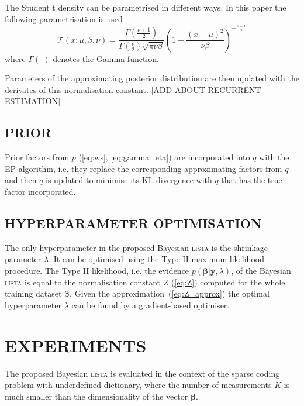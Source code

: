 \documentclass[letterpaper]{article}
\begin{document}
The Student t density can be parametrised in different ways. In this paper the following parametrisation is used 
\begin{equation}
\mathcal{T}(x; \mu, \beta, \nu) = \frac{\Gamma\left(\frac{\nu + 1}{2}\right)}{\Gamma\left(\frac{\nu}{2}\right)\sqrt{\pi \nu \beta}} \left(1 + \frac{(x - \mu)^2}{\nu\beta}\right)^{-\frac{\nu + 1}{2}}
\end{equation}
where $\Gamma(\cdot)$ denotes the Gamma function.

Parameters of the approximating posterior distribution are then updated with the derivates of this normalisation constant. [ADD ABOUT RECURRENT ESTIMATION]

\subsection{\uppercase{Prior}}
Prior factors from $p$ (\ref{eq:ws}, \ref{eq:gamma_eta}) are incorporated into $q$ with the EP algorithm, i.e. they replace the corresponding approximating factors from $q$ and then $q$ is updated to minimise its KL divergence with $q$ that has the true factor incorporated.

\subsection{\uppercase{Hyperparameter optimisation}}
The only hyperparameter in the proposed Bayesian \textsc{lista} is the shrinkage parameter $\lambda$. It can be optimised using the Type II maximum likelihood procedure. The Type II likelihood, i.e. the evidence $p(\boldsymbol\beta | \mathbf{y}, \lambda)$, of the Bayesian \textsc{lista} is equal to the normalisation constant $Z$ (\ref{eq:Z}) computed for the whole training dataset $\boldsymbol\beta$. Given the approximation~(\ref{eq:Z_approx}) the optimal hyperparameter $\lambda$ can be found by a gradient-based optimiser.

\section{\uppercase{Experiments}}
\label{sec:experiments}
The proposed Bayesian \textsc{lista} is evaluated in the context of the sparse coding problem with underdefined dictionary, where the number of measurements $K$ is much smaller than the dimensionality of the vector $\boldsymbol\beta$.
\end{document}

